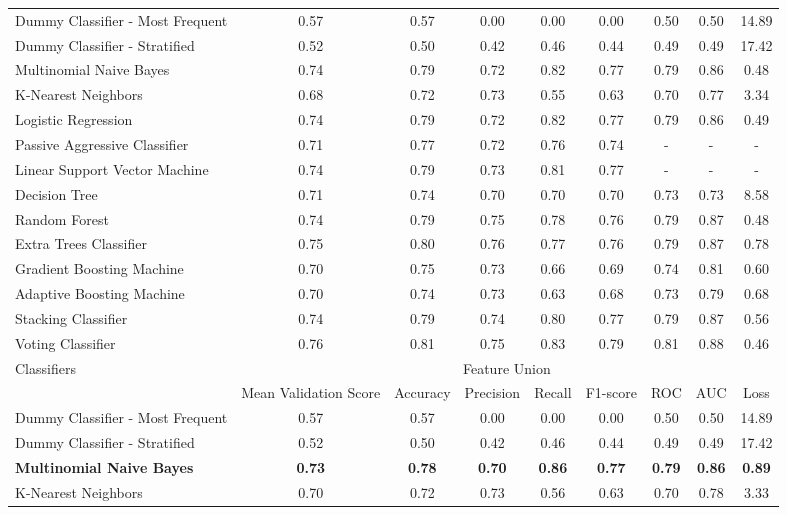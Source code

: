 \documentclass[jou]{apa7}
\begin{document}
\begin{landscape}
\begin{longtable}[l]{lcccccccc}
    Dummy Classifier - Most   Frequent & 0.57 & 0.57 & 0.00 & 0.00 & 0.00 & 0.50 & 0.50 & 14.89 \\
    Dummy Classifier - Stratified & 0.52 & 0.50 & 0.42 & 0.46 & 0.44 & 0.49 & 0.49 & 17.42 \\
    Multinomial Naive Bayes & 0.74 & 0.79 & 0.72 & 0.82 & 0.77 & 0.79 & 0.86 & 0.48 \\
    K-Nearest Neighbors & 0.68 & 0.72 & 0.73 & 0.55 & 0.63 & 0.70 & 0.77 & 3.34 \\
    Logistic Regression & 0.74 & 0.79 & 0.72 & 0.82 & 0.77 & 0.79 & 0.86 & 0.49 \\
    Passive Aggressive Classifier & 0.71 & 0.77 & 0.72 & 0.76 & 0.74 & - & - & - \\
    Linear Support Vector Machine & 0.74 & 0.79 & 0.73 & 0.81 & 0.77 & - & - & - \\
    Decision Tree & 0.71 & 0.74 & 0.70 & 0.70 & 0.70 & 0.73 & 0.73 & 8.58 \\
    Random Forest & 0.74 & 0.79 & 0.75 & 0.78 & 0.76 & 0.79 & 0.87 & 0.48 \\
    Extra Trees Classifier & 0.75 & 0.80 & 0.76 & 0.77 & 0.76 & 0.79 & 0.87 & 0.78 \\
    Gradient Boosting Machine & 0.70 & 0.75 & 0.73 & 0.66 & 0.69 & 0.74 & 0.81 & 0.60 \\
    Adaptive Boosting Machine & 0.70 & 0.74 & 0.73 & 0.63 & 0.68 & 0.73 & 0.79 & 0.68 \\
    Stacking Classifier & 0.74 & 0.79 & 0.74 & 0.80 & 0.77 & 0.79 & 0.87 & 0.56 \\
    Voting Classifier & 0.76 & 0.81 & 0.75 & 0.83 & 0.79 & 0.81 & 0.88 & 0.46 \\ \hline
    \multirow{2}{*}{Classifiers} & \multicolumn{8}{c}{Feature Union} \\ \cline{2-9}
    & Mean   Validation Score & Accuracy & Precision & Recall & F1-score & ROC & AUC & Loss \\ \hline
    Dummy Classifier - Most   Frequent & 0.57 & 0.57 & 0.00 & 0.00 & 0.00 & 0.50 & 0.50 & 14.89 \\
    Dummy Classifier - Stratified & 0.52 & 0.50 & 0.42 & 0.46 & 0.44 & 0.49 & 0.49 & 17.42 \\
    \textbf{Multinomial Naive Bayes} & \textbf{0.73} & \textbf{0.78} & \textbf{0.70} & \textbf{0.86} & \textbf{0.77} & \textbf{0.79} & \textbf{0.86} & \textbf{0.89} \\
    K-Nearest Neighbors & 0.70 & 0.72 & 0.73 & 0.56 & 0.63 & 0.70 & 0.78 & 3.33 \\

\end{longtable}
\end{landscape}
\end{document}

